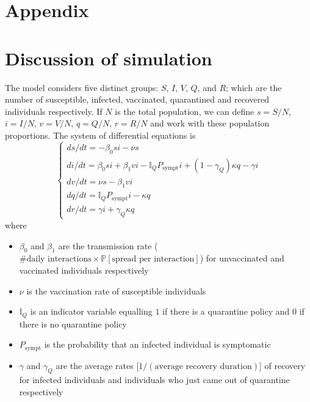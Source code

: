 \documentclass[12pt,a4paper]{article}
\begin{document}
\begin{appendices}

\newpage
\section*{Appendix}
\section{Discussion of simulation}\label{appendixA}

The model considers five distinct groups: $S$, $I$, $V$, $Q$, and $R$; which are the number of susceptible, infected, vaccinated, quarantined and recovered individuals respectively. If $N$ is the total population, we can define $s=S/N$, $i=I/N$, $v=V/N$, $q=Q/N$, $r=R/N$ and work with these population proportions. The system of differential equations is
\begin{equation}
	\begin{cases}
	ds/dt = -\beta_0si-\nu s\\
	di/dt = \beta_0si + \beta_1 vi - \mathbb{I}_QP_\text{sympt}i+(1-\gamma_Q)\kappa q - \gamma i\\
	dv/dt = \nu s - \beta_1	vi\\
	dq/dt = \mathbb{I}_QP_\text{sympt}i - \kappa q\\
	dr/dt = \gamma i +\gamma_Q\kappa q
	\end{cases}
\end{equation}
where 
\vspace*{-3mm}
\begin{itemize}
	\item $\beta_0$ and $\beta_1$ are the transmission rate ($\text{\# daily interactions}\times\mathbb{P}[\text{spread per interaction}]$) for unvaccinated and vaccinated individuals respectively
	\vspace*{-3mm}
	\item $\nu$ is the vaccination rate of susceptible individuals
	\vspace*{-3mm}
	\item $\mathbb{I}_Q$ is an indicator variable equalling $1$ if there is a quarantine policy and $0$ if there is no quarantine policy
	\vspace*{-3mm}
	\item $P_\text{sympt}$ is the probability that an infected individual is symptomatic
	\vspace*{-3mm}
	\item $\gamma$ and $\gamma_Q$ are the average rates [$1/(\text{average recovery duration})$] of recovery for infected individuals and individuals who just came out of quarantine respectively

\end{itemize}
\end{appendices}
\end{document}
